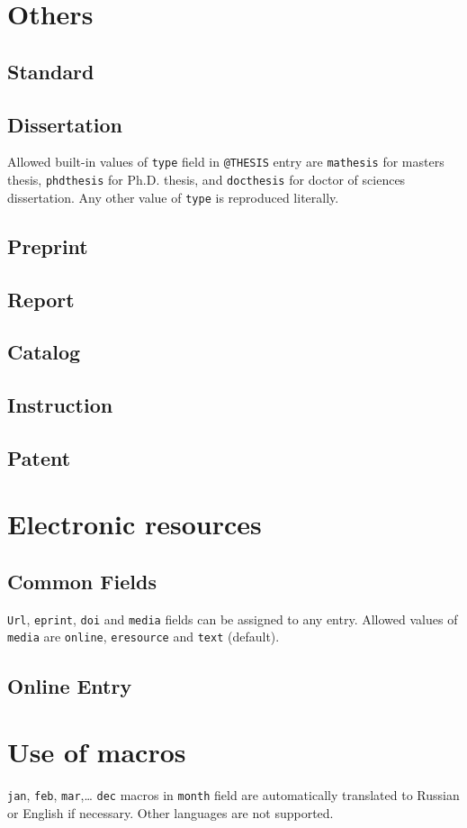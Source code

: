 \documentclass[a4paper]{article}
\begin{document}
\section{Others}

\subsection{Standard}

\subsection{Dissertation}
Allowed built-in values of \verb|type| field in \verb|@THESIS| entry are \verb|mathesis| for masters thesis, \verb|phdthesis| for Ph.D. thesis, and \verb|docthesis| for doctor of sciences dissertation. Any other value of \verb|type| is reproduced literally.

\subsection{Preprint}

\subsection{Report}

\subsection{Catalog}

\subsection{Instruction}

\subsection{Patent}


\section{Electronic resources}

\subsection{Common Fields}
\verb|Url|, \verb|eprint|, \verb|doi| and \verb|media| fields can be assigned to any entry. Allowed values of \verb|media| are \verb|online|, \verb|eresource| and \verb|text| (default).

\subsection{Online Entry}

\section{Use of macros}

\texttt{jan}, \texttt{feb}, \texttt{mar},\ldots{} \texttt{dec} macros in \texttt{month} field
are automatically translated to Russian or English if necessary. Other languages are not supported.
\end{document}

